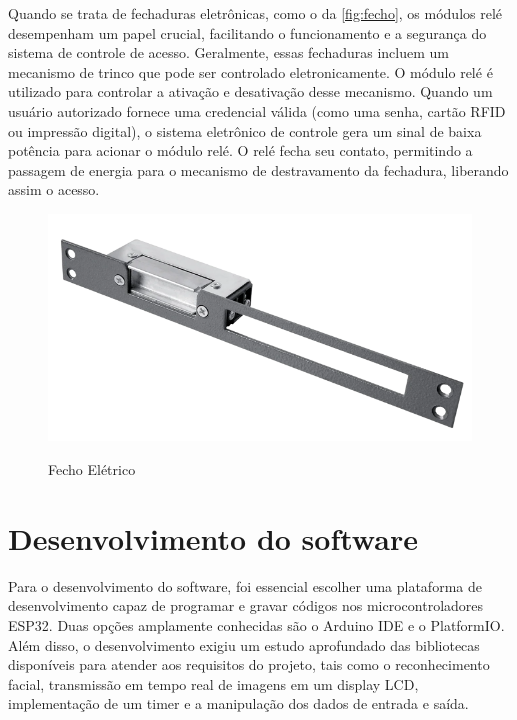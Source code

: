 Quando se trata de fechaduras eletrônicas, como o da \autoref{fig:fecho}, 
os módulos relé desempenham um papel crucial, facilitando o funcionamento e 
a segurança do sistema de controle de acesso. Geralmente, essas fechaduras 
incluem um mecanismo de trinco que pode ser controlado eletronicamente. 
O módulo relé é utilizado para controlar a ativação e desativação 
desse mecanismo. Quando um usuário autorizado fornece uma credencial 
válida (como uma senha, cartão RFID ou impressão digital), o sistema 
eletrônico de controle gera um sinal de baixa potência para acionar 
o módulo relé. O relé fecha seu contato, permitindo a passagem de 
energia para o mecanismo de destravamento da fechadura, liberando 
assim o acesso.

\begin{figure}[h!]
    \centering
    \caption{Fecho Elétrico}
    \includegraphics[scale=0.25]{figuras/fechoagl.png}
    \label{fig:fecho}
    \centering
\end{figure}

\section{Desenvolvimento do software}\label{sec:software}

Para o desenvolvimento do software, foi essencial escolher uma plataforma 
de desenvolvimento capaz de programar e gravar códigos nos microcontroladores 
ESP32. Duas opções amplamente conhecidas são o Arduino IDE e o PlatformIO. 
Além disso, o desenvolvimento exigiu um estudo aprofundado das 
bibliotecas disponíveis para atender aos requisitos do projeto, 
tais como o reconhecimento facial, transmissão em tempo real de 
imagens em um display LCD, implementação de um timer e a manipulação 
dos dados de entrada e saída.

